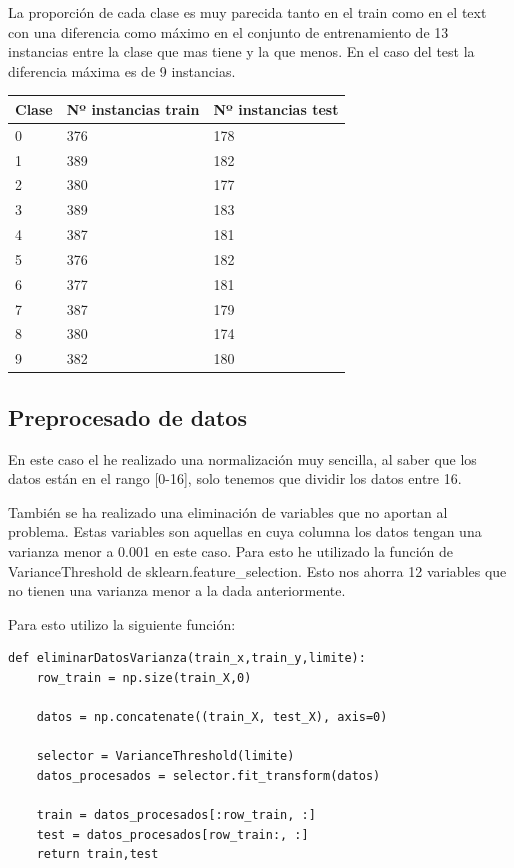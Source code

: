 \documentclass[titlepage]{article}
\begin{document}
	La proporción de cada clase es muy parecida tanto en el train como en el text con una diferencia como máximo en el conjunto de entrenamiento de 13 instancias entre la clase que mas tiene y la que menos. En el caso del test la diferencia máxima es de 9 instancias. 
	
		\begin{table}[htbp]
		\begin{center}
			\begin{tabular}{|l|l|l|}
				\hline
				Clase & Nº instancias train & Nº instancias test\\
				\hline
				0 & 376 & 178\\ 
				\hline
				1 & 389 & 182\\ 
				\hline
				2 & 380 & 177\\ 
				\hline
				3 & 389 & 183\\ 
				\hline
				4 & 387 & 181\\ 
				\hline
				5 & 376 & 182\\ 
				\hline
				6 & 377 & 181\\ 
				\hline
				7 & 387 & 179\\ 
				\hline
				8 & 380 & 174\\ 
				\hline
				9 & 382 & 180\\ 
				\hline
			\end{tabular}
		\end{center}
	\end{table}
	\newpage
	
	\subsection{Preprocesado de datos}
	En este caso el he realizado una normalización muy sencilla, al saber que los datos están en el rango [0-16], solo tenemos que dividir los datos entre 16.
	
	También se ha realizado una eliminación de variables que no aportan al problema. Estas variables son aquellas en cuya columna los datos tengan una varianza menor a 0.001 en este caso. Para esto he utilizado la función de VarianceThreshold de sklearn.feature\_selection.
	Esto nos ahorra 12 variables que no tienen una varianza menor a la dada anteriormente.
	
	Para esto utilizo la siguiente función:
	\begin{lstlisting}
def eliminarDatosVarianza(train_x,train_y,limite):
	row_train = np.size(train_X,0)
	
	datos = np.concatenate((train_X, test_X), axis=0)
	
	selector = VarianceThreshold(limite)
	datos_procesados = selector.fit_transform(datos)
	
	train = datos_procesados[:row_train, :]
	test = datos_procesados[row_train:, :]
	return train,test
	\end{lstlisting}
	
\end{document}
